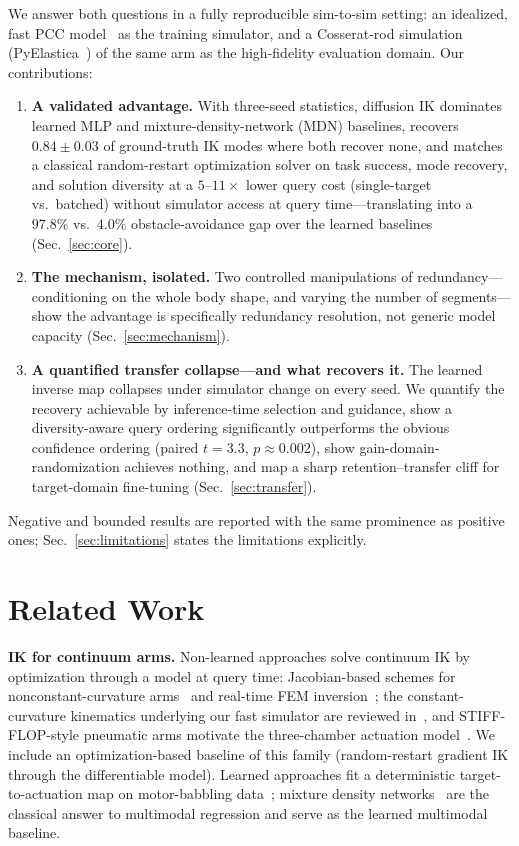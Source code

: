 We answer both questions in a fully reproducible sim-to-sim setting: an
idealized, fast PCC model~\cite{webster2010design} as the training simulator,
and a Cosserat-rod simulation (PyElastica~\cite{gazzola2018forward,
zhang2019modeling}) of the same arm as the high-fidelity evaluation domain.
Our contributions:
\begin{enumerate}
  \item \textbf{A validated advantage.} With three-seed statistics, diffusion
  IK dominates learned MLP and mixture-density-network (MDN) baselines,
  recovers $0.84\pm0.03$ of ground-truth IK modes where both
  recover none, and matches a classical random-restart optimization solver
  on task success, mode recovery, and solution diversity at a
  $5$--$11\times$ lower query cost (single-target vs.\ batched) without
  simulator access at query time---translating into a $97.8\%$ vs.\ $4.0\%$
  obstacle-avoidance gap over the learned baselines (Sec.~\ref{sec:core}).
  \item \textbf{The mechanism, isolated.} Two controlled manipulations of
  redundancy---conditioning on the whole body shape, and varying the number
  of segments---show the advantage is specifically redundancy resolution,
  not generic model capacity (Sec.~\ref{sec:mechanism}).
  \item \textbf{A quantified transfer collapse---and what recovers it.} The
  learned inverse map collapses under simulator change on every seed. We
  quantify the recovery achievable by inference-time selection and guidance,
  show a diversity-aware query ordering significantly outperforms the obvious
  confidence ordering (paired $t{=}3.3$, $p{\approx}0.002$), show
  gain-domain-randomization achieves nothing, and map a sharp
  retention--transfer cliff for target-domain fine-tuning
  (Sec.~\ref{sec:transfer}).
\end{enumerate}
Negative and bounded results are reported with the same prominence as
positive ones; Sec.~\ref{sec:limitations} states the limitations explicitly.

\section{Related Work}

\textbf{IK for continuum arms.} Non-learned approaches solve continuum IK by
optimization through a model at query time: Jacobian-based schemes for
nonconstant-curvature arms~\cite{giorelli2015neural} and real-time FEM
inversion~\cite{duriez2013control}; the constant-curvature kinematics
underlying our fast simulator are reviewed in~\cite{webster2010design}, and
STIFF-FLOP-style pneumatic arms motivate the three-chamber actuation
model~\cite{cianchetti2014soft}. We include an optimization-based baseline
of this family (random-restart gradient IK through the differentiable
model). Learned approaches fit a deterministic target-to-actuation map on
motor-babbling data~\cite{giorelli2015neural}; mixture density
networks~\cite{bishop1994mixture} are the classical answer to multimodal
regression and serve as the learned multimodal baseline.

